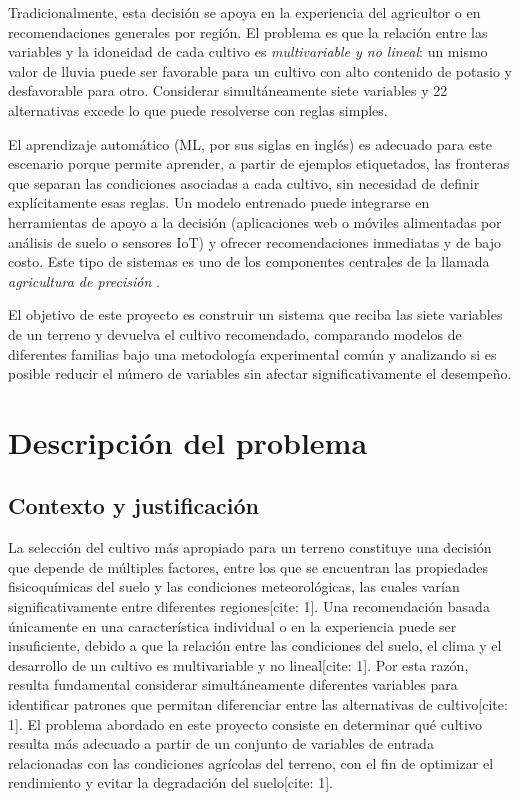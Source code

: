 \documentclass[conference]{IEEEtran}
\begin{document}
Tradicionalmente, esta decisión se apoya en la experiencia del agricultor o en recomendaciones generales por región. El problema es que la relación entre las variables y la idoneidad de cada cultivo es \emph{multivariable y no lineal}: un mismo valor de lluvia puede ser favorable para un cultivo con alto contenido de potasio y desfavorable para otro. Considerar simultáneamente siete variables y 22 alternativas excede lo que puede resolverse con reglas simples.

El aprendizaje automático (ML, por sus siglas en inglés) es adecuado para este escenario porque permite aprender, a partir de ejemplos etiquetados, las fronteras que separan las condiciones asociadas a cada cultivo, sin necesidad de definir explícitamente esas reglas. Un modelo entrenado puede integrarse en herramientas de apoyo a la decisión (aplicaciones web o móviles alimentadas por análisis de suelo o sensores IoT) y ofrecer recomendaciones inmediatas y de bajo costo. Este tipo de sistemas es uno de los componentes centrales de la llamada \emph{agricultura de precisión} \cite{thilakarathne2022,shastri2025}.

El objetivo de este proyecto es construir un sistema que reciba las siete variables de un terreno y devuelva el cultivo recomendado, comparando modelos de diferentes familias bajo una metodología experimental común y analizando si es posible reducir el número de variables sin afectar significativamente el desempeño.


\section{Descripción del problema}

\subsection{Contexto y justificación}
La selección del cultivo más apropiado para un terreno constituye una decisión que depende de múltiples factores, entre los que se encuentran las propiedades fisicoquímicas del suelo y las condiciones meteorológicas, las cuales varían significativamente entre diferentes regiones[cite: 1]. Una recomendación basada únicamente en una característica individual o en la experiencia puede ser insuficiente, debido a que la relación entre las condiciones del suelo, el clima y el desarrollo de un cultivo es multivariable y no lineal[cite: 1]. Por esta razón, resulta fundamental considerar simultáneamente diferentes variables para identificar patrones que permitan diferenciar entre las alternativas de cultivo[cite: 1]. El problema abordado en este proyecto consiste en determinar qué cultivo resulta más adecuado a partir de un conjunto de variables de entrada relacionadas con las condiciones agrícolas del terreno, con el fin de optimizar el rendimiento y evitar la degradación del suelo[cite: 1].
\end{document}
